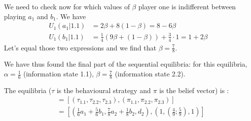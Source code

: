 \begin{itemize}
    We need to check now for which values of $\beta$ player one is indifferent between playing $a_1$ and $b_1$. We have 
    \begin{align*}
        U_1(a_1|1.1)&= 2\beta + 8 (1-\beta) = 8 - 6 \beta\\
        U_1(b_1|1.1)&=\frac{1}{4} (9\beta + (1-\beta) ) + \frac{3}{4} \cdot 1 = 1 + 2\beta
    \end{align*} 
    Let's equal those two expressions and we find that $\beta = \frac{7}{8}$. 
    
    We have thus found the final part of the sequential equilibria: for this equilibria, $\alpha=\frac{1}{6}$ (information state 1.1), $\beta =\frac{7}{8}$ (information state 2.2).
\end{itemize}
    
The equilibria  ($\tau$ is the behavioural strategy and $\pi$ is the belief vector) is :
\begin{align*}
        [\tau, \pi ]&= \left[ \left(\tau_{1.1},\tau_{2.2},\tau_{2.3} \right), \left(\pi_{1.1}, \pi_{2.2} , \pi_{2.3}\right) \right]\\
        &=\left[ \left(\frac{1}{6} a_1 + \frac{5}{6} b_1, \frac{7}{8} a_2 +\frac{1}{8} b_2, d_2\right) , \left( 1, (\frac{4}{9};\frac{5}{9}),1\right)\right]
\end{align*} 
